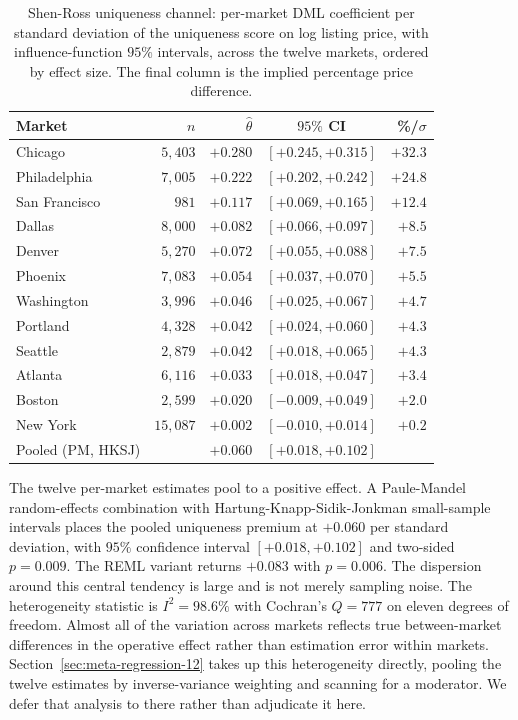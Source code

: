 \begin{table}[H]
\centering
\caption{Shen-Ross uniqueness channel: per-market DML coefficient per standard
deviation of the uniqueness score on log listing price, with influence-function
$95\%$ intervals, across the twelve markets, ordered by effect size. The final
column is the implied percentage price difference.}
\label{tab:shen-12city}
\small
\begin{tabular}{lrrc r}
\toprule
Market & $n$ & $\hat\theta$ & $95\%$ CI & \%/$\sigma$ \\
\midrule
Chicago       & $5{,}403$  & $+0.280$ & $[+0.245, +0.315]$ & $+32.3$ \\
Philadelphia  & $7{,}005$  & $+0.222$ & $[+0.202, +0.242]$ & $+24.8$ \\
San Francisco & $981$      & $+0.117$ & $[+0.069, +0.165]$ & $+12.4$ \\
Dallas        & $8{,}000$  & $+0.082$ & $[+0.066, +0.097]$ & $+8.5$  \\
Denver        & $5{,}270$  & $+0.072$ & $[+0.055, +0.088]$ & $+7.5$  \\
Phoenix       & $7{,}083$  & $+0.054$ & $[+0.037, +0.070]$ & $+5.5$  \\
Washington    & $3{,}996$  & $+0.046$ & $[+0.025, +0.067]$ & $+4.7$  \\
Portland      & $4{,}328$  & $+0.042$ & $[+0.024, +0.060]$ & $+4.3$  \\
Seattle       & $2{,}879$  & $+0.042$ & $[+0.018, +0.065]$ & $+4.3$  \\
Atlanta       & $6{,}116$  & $+0.033$ & $[+0.018, +0.047]$ & $+3.4$  \\
Boston        & $2{,}599$  & $+0.020$ & $[-0.009, +0.049]$ & $+2.0$  \\
New York      & $15{,}087$ & $+0.002$ & $[-0.010, +0.014]$ & $+0.2$  \\
\midrule
Pooled (PM, HKSJ) & & $+0.060$ & $[+0.018, +0.102]$ & \\
\bottomrule
\end{tabular}
\end{table}

The twelve per-market estimates pool to a positive effect. A Paule-Mandel
random-effects combination with Hartung-Knapp-Sidik-Jonkman small-sample
intervals places the pooled uniqueness premium at $+0.060$ per standard deviation,
with $95\%$ confidence interval $[+0.018, +0.102]$ and two-sided $p = 0.009$. The
REML variant returns $+0.083$ with $p = 0.006$. The dispersion around this
central tendency is large and is not merely sampling noise. The
heterogeneity statistic is $I^2 = 98.6\%$ with Cochran's $Q = 777$ on eleven
degrees of freedom. Almost all of the variation across markets reflects
true between-market differences in the operative effect rather than estimation
error within markets. Section~\ref{sec:meta-regression-12} takes up this
heterogeneity directly, pooling the twelve estimates by inverse-variance weighting
and scanning for a moderator. We defer that analysis to there rather than
adjudicate it here.

